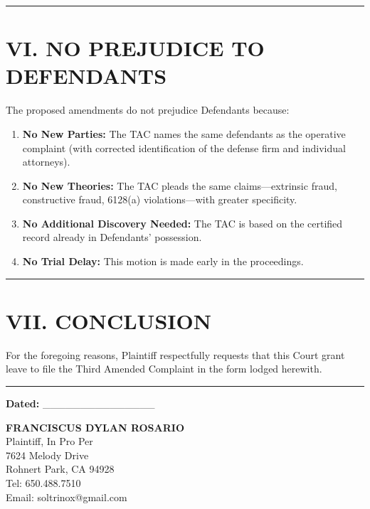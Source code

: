\begin{center}\rule{0.5\linewidth}{0.5pt}\end{center}

\label{toc:vi-no-prejudice-to-defendants}
\section{VI. NO PREJUDICE TO DEFENDANTS}\label{vi.-no-prejudice-to-defendants}

The proposed amendments do not prejudice Defendants because:

\begin{enumerate}
\def\labelenumi{\arabic{enumi}.}
\item
  \textbf{No New Parties:} The TAC names the same defendants as the operative complaint (with corrected identification of the defense firm and individual attorneys).
\item
  \textbf{No New Theories:} The TAC pleads the same claims---extrinsic fraud, constructive fraud, \textsection{} 6128(a) violations---with greater specificity.
\item
  \textbf{No Additional Discovery Needed:} The TAC is based on the certified record already in Defendants' possession.
\item
  \textbf{No Trial Delay:} This motion is made early in the proceedings.
\end{enumerate}

\begin{center}\rule{0.5\linewidth}{0.5pt}\end{center}

\label{toc:vii-conclusion}
\section{VII. CONCLUSION}\label{vii.-conclusion}

For the foregoing reasons, Plaintiff respectfully requests that this Court grant leave to file the Third Amended Complaint in the form lodged herewith.

\begin{center}\rule{0.5\linewidth}{0.5pt}\end{center}

\textbf{Dated:} \_\_\_\_\_\_\_\_\_\_\_\_\_\_\_

\textbf{FRANCISCUS DYLAN ROSARIO}\\
Plaintiff, In Pro Per\\
7624 Melody Drive\\
Rohnert Park, CA 94928\\
Tel: 650.488.7510\\
Email: soltrinox@gmail.com

\nolinenumbers



